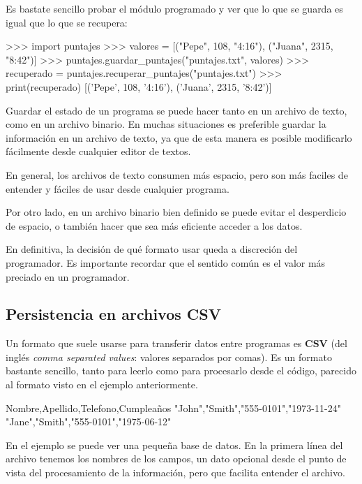 Es bastate sencillo probar el módulo programado y ver que lo que se guarda
es igual que lo que se recupera:

\begin{codigo-python-sn}
>>> import puntajes
>>> valores = [("Pepe", 108, "4:16"), ("Juana", 2315, "8:42")]
>>> puntajes.guardar_puntajes("puntajes.txt", valores)
>>> recuperado = puntajes.recuperar_puntajes("puntajes.txt")
>>> print(recuperado)
[('Pepe', 108, '4:16'), ('Juana', 2315, '8:42')]
\end{codigo-python-sn}


Guardar el estado de un programa se puede hacer tanto en un
archivo de texto, como en un archivo binario. En muchas
situaciones es preferible guardar la información en un archivo de
texto, ya que de esta manera es posible modificarlo fácilmente
desde cualquier editor de textos.

En general, los archivos de texto consumen más
espacio, pero son más faciles de entender y fáciles de usar desde
cualquier programa.

Por otro lado, en un archivo binario bien definido se puede evitar el
desperdicio de espacio, o también hacer que sea más eficiente acceder a los
datos.

En definitiva, la decisión de qué formato usar queda a discreción del
programador. Es importante recordar que el sentido común es el valor más
preciado en un programador.

\subsection{Persistencia en archivos CSV}

Un formato que suele usarse para transferir datos entre programas es
\textbf{CSV} (del inglés \emph{comma separated values}: valores separados
por comas). Es un formato bastante sencillo, tanto para leerlo como para
procesarlo desde el código, parecido al formato visto en el ejemplo
anteriormente.

\begin{codigo-nohl-sn}
Nombre,Apellido,Telefono,Cumpleaños
"John","Smith","555-0101","1973-11-24"
"Jane","Smith","555-0101","1975-06-12"
\end{codigo-nohl-sn}

En el ejemplo se puede ver una pequeña base de datos. En la primera línea
del archivo tenemos los nombres de los campos, un dato opcional desde el
punto de vista del procesamiento de la información, pero que facilita
entender el archivo.

